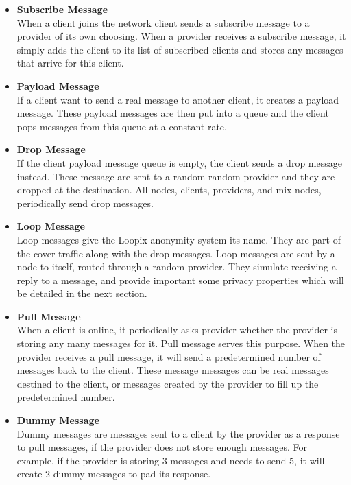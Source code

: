 \documentclass[a4paper,11pt,oneside]{report}
\begin{document}
\begin{itemize}
    \item \textbf{Subscribe Message} \\
    When a client joins the network client sends a subscribe message to a provider of its own choosing. When a provider receives a subscribe message, it simply adds the client to its list of subscribed clients and stores any messages that arrive for this client.
    \item \textbf{Payload Message} \\
    If a client want to send a real message to another client, it creates a payload message. These payload messages are then put into a queue and the client pops messages from this queue at a constant rate.
    \item \textbf{Drop Message} \\
    If the client payload message queue is empty, the client sends a drop message instead. These message are sent to a random random provider and they are dropped at the destination. All nodes, clients, providers, and mix nodes, periodically send drop messages.
    \item \textbf{Loop Message} \\
    Loop messages give the Loopix anonymity system its name. They are part of the cover traffic along with the drop messages. Loop messages are sent by a node to itself, routed through a random provider. They simulate receiving a reply to a message, and provide important some privacy properties which will be detailed in the next section.
    \item \textbf{Pull Message} \\
    When a client is online, it periodically asks provider whether the provider is storing any many messages for it. Pull message serves this purpose. When the provider receives a pull message, it will send a predetermined number of messages back to the client. These message messages can be real messages destined to the client, or messages created by the provider to fill up the predetermined number.
    \item \textbf{Dummy Message} \\
    Dummy messages are messages sent to a client by the provider as a response to pull messages, if the provider does not store enough messages. For example, if the provider is storing 3 messages and needs to send 5, it will create 2 dummy messages to pad its response.
\end{itemize}

\end{document}
